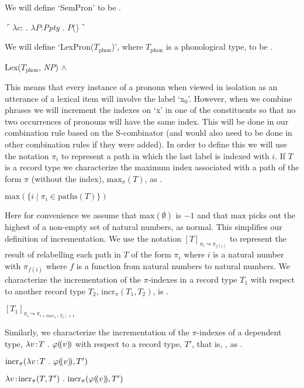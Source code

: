   
We will define `SemPron' to be \nexteg{}.
\begin{ex} 
  $\ulcorner\lambda c$: . $\lambda P$:\textit{Ppty} . $P$()$\urcorner$
\end{ex}
We will define `LexPron($T_{\text{phon}}$)', where $T_{\text{phon}}$
is a phonological type, to be \nexteg{}.
\begin{ex} 
Lex($T_{\mathrm{phon}}$, \textit{NP}) \d{$\wedge$}
\end{ex}

This means that every instance of a pronoun when viewed in isolation
as an utterance of a lexical item will involve the label `x$_0$'.
However, when we combine phrases we will increment the indexes on `x'
in one of the constituents so that no two occurrences of pronouns will
have the same index.  This will be done in our combination rule based
on the S-combinator (and would also need to be done in other
combination rules if they were added).  In order to define this we
will use the notation $\pi_i$ to represent a path in which the last
label is indexed with $i$.  If $T$ is a record type we characterize
the maximum index associated with a path of the form $\pi$ (without
the index), $\mathrm{max}_\pi(T)$, as \nexteg{}.
\begin{ex} 
$\mathrm{max}(\{i\mid\pi_i\in\mathrm{paths}(T)\})$ 
\end{ex}
Here for convenience we assume that $\mathrm{max}(\emptyset)$ is $-1$
and that $\mathrm{max}$ picks out the highest of a non-empty set of
natural numbers, as normal.  This simplifies our definition of incrementation.
We use the notation $[T]_{\pi_i\leadsto\pi_{f(i)}}$ to represent the
result of relabelling each path in $T$ of the form $\pi_i$ where $i$
is a natural number with $\pi_{f(i)}$ where $f$ is a function from
natural numbers to natural numbers.  We characterize the incrementation of the $\pi$-indexes in a record
type $T_1$ with respect to another record type $T_2$,
$\mathrm{incr}_\pi(T_1,T_2)$, is \nexteg{}.\label{pg:incr}
\begin{ex} 
$[T_1]_{\pi_i\leadsto\pi_{i+max_\pi(T_2)+1}}$
\end{ex}
Similarly, we characterize the incrementation of the $\pi$-indexes of
a dependent type, $\lambda
v\!:\!T\ .\ \varphi(\!(v)\!)$ with respect to a record type, $T'$, that is, ,
as .
\begin{ex}
  \begin{subex}
    \item $\mathrm{incr}_\pi(\lambda
v\!:\!T\ .\ \varphi(\!(v)\!), T')$
\item $\lambda v\!:\!\mathrm{incr}_\pi(T,T')\ .\
  \mathrm{incr}_{\pi}(\varphi(\!(v)\!), T')$
\end{subex}

\end{ex} 
  

